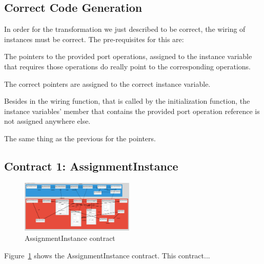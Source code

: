 \subsection{Correct Code Generation}


In order for the transformation we just described to be correct, the wiring of
instances must be correct. The pre-requisites for this are:

\begin{compactenum}

\item The pointers to the provided port operations, assigned to the instance
variable that requires those operations do really point to the corresponding
operations.

\item The correct pointers are assigned to the correct instance variable.

\item Besides in the wiring function, that is called by the initialization
function, the instance variables' member that contains the provided port
operation reference is not assigned anywhere else.

\item The same thing as the previous for the pointers.
\end{compactenum}



\subsection{Contract 1: AssignmentInstance}

\begin{figure}
\begin{center}
  \includegraphics[width=0.48\textwidth]{figures/mbeddr/contracts/AssignmentInstance}
  \caption{AssignmentInstance contract}
  \label{fig:assignment_instance}
\end{center}
\end{figure}

Figure~\ref{fig:assignment_instance} shows the AssignmentInstance contract. This contract...

